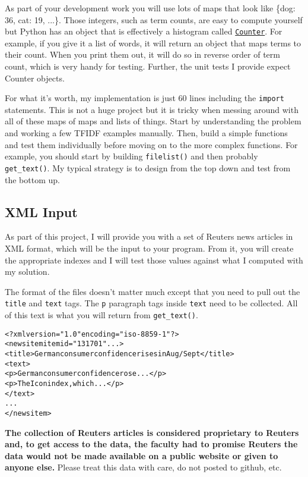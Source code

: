 \begin{fullwidth}
As part of your development work you will use lots of maps that look like \{dog: 36, cat: 19, ...\}.   Those integers, such as term counts, are easy to compute yourself but Python has an object that is effectively a histogram called \href{https://docs.python.org/2/library/collections.html#collections.Counter}{{\tt Counter}}. For example, if you give it a list of words, it will return an object that maps terms to their count. When you print them out, it will do so in reverse order of term count, which is very handy for testing.  Further, the unit tests I provide expect Counter objects.

For what it's worth, my implementation is just 60 lines including the {\tt import} statements. This is not a huge project but it is tricky when messing around with all of these maps of maps and lists of things. Start by understanding the problem and working a few TFIDF examples manually. Then, build a simple functions and test them individually before moving on to the more complex functions. For example, you should start by building {\tt filelist()} and then probably {\tt get\_text()}. My typical strategy is to design from the top down and test from the bottom up.

\subsection{XML Input}

As part of this project, I will provide you with a set of Reuters news articles in XML format, which will be the input to your program. From it, you will create the appropriate indexes and I will test those values against what I computed with my solution.

The format of the files doesn't matter much except that you need to pull out the {\tt title} and {\tt text} tags. The {\tt p} paragraph tags inside {\tt text} need to be collected. All of this text is what you will return from {\tt get\_text()}.
 
\begin{alltt}
<?xml version="1.0" encoding="iso-8859-1" ?>
<newsitem itemid="131701" ...>
<title>German consumer confidence rises in Aug/Sept</title>
<text>
<p>German consumer confidence rose...</p>
<p>The Icon index, which...</p>
</text>
...
</newsitem>
\end{alltt}

{\bf The collection of Reuters articles is considered proprietary to Reuters and, to get access to the data, the faculty had to promise Reuters the data would not be made available on a public website or given to anyone else.} Please treat this data with care, do not posted to github, etc.


\end{fullwidth}
